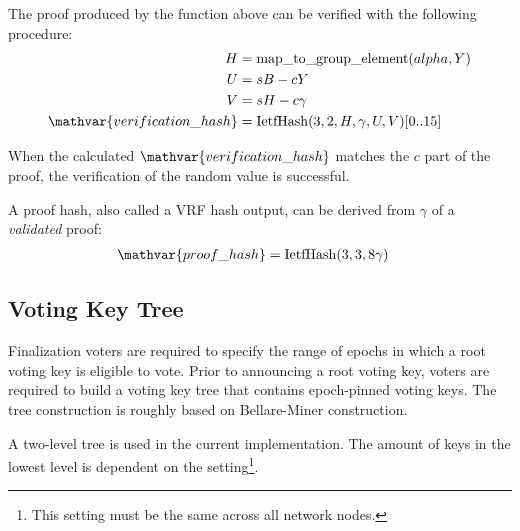 The proof produced by the function above can be verified with the following procedure:
\begin{align*}
	H &= \mathfunc{map\_to\_group\_element}(alpha, Y) \\
	U &= sB - cY \\
	V &= sH - c \gamma \\
	\mathvar{verification\_hash} &= \mathfunc{IetfHash}(3, 2, H, \gamma, U, V)[0..15]
\end{align*}

When the calculated $\mathvar{verification\_hash}$ matches the $c$ part of the proof, the verification of the random value is successful.

A proof hash, also called a VRF hash output, can be derived from $\gamma$ of a \emph{validated} proof:
\begin{align}
	\mathvar{proof\_hash} &= \mathfunc{IetfHash}(3, 3, 8 \gamma) \label{eq:cryptography:proofHash}
\end{align}

\subsection{Voting Key Tree}
\label{sec:cryptography:voting}

Finalization voters are required to specify the range of epochs in which a root voting key is eligible to vote.
Prior to announcing a root voting key, voters are required to build a voting key tree that contains epoch-pinned voting keys.
The tree construction is roughly based on Bellare-Miner \cite{BellareMiner1999} construction.

A two-level tree is used in the current implementation.
The amount of keys in the lowest level is dependent on the  setting\footnote{
	This setting must be the same across all network nodes.
}.

